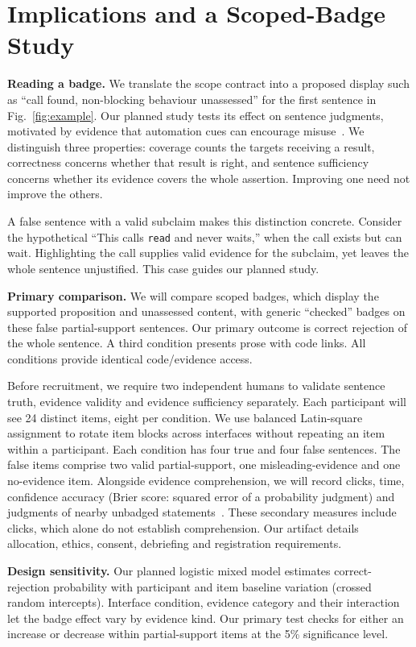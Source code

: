 \section{Implications and a Scoped-Badge Study}\label{sec:agenda}
\noindent\textbf{Reading a badge.} We translate the scope contract into a proposed display such as ``call found, non-blocking behaviour unassessed'' for the first sentence in Fig.~\ref{fig:example}. Our planned study tests its effect on sentence judgments, motivated by evidence that automation cues can encourage misuse~\cite{parasuraman1997automation,bucinca2021trust}. We distinguish three properties: coverage counts the targets receiving a result, correctness concerns whether that result is right, and sentence sufficiency concerns whether its evidence covers the whole assertion. Improving one need not improve the others.

A false sentence with a valid subclaim makes this distinction concrete. Consider the hypothetical ``This calls \texttt{read} and never waits,'' when the call exists but can wait. Highlighting the call supplies valid evidence for the subclaim, yet leaves the whole sentence unjustified. This case guides our planned study.

\noindent\textbf{Primary comparison.} We will compare scoped badges, which display the supported proposition and unassessed content, with generic ``checked'' badges on these false partial-support sentences. Our primary outcome is correct rejection of the whole sentence. A third condition presents prose with code links. All conditions provide identical code/evidence access.

Before recruitment, we require two independent humans to validate sentence truth, evidence validity and evidence sufficiency separately. Each participant will see 24 distinct items, eight per condition. We use balanced Latin-square assignment to rotate item blocks across interfaces without repeating an item within a participant. Each condition has four true and four false sentences. The false items comprise two valid partial-support, one misleading-evidence and one no-evidence item. Alongside evidence comprehension, we will record clicks, time, confidence accuracy (Brier score: squared error of a probability judgment) and judgments of nearby unbadged statements~\cite{pennycook2020impliedtruth}. These secondary measures include clicks, which alone do not establish comprehension. Our artifact details allocation, ethics, consent, debriefing and registration requirements.

\balance
\noindent\textbf{Design sensitivity.} Our planned logistic mixed model estimates correct-rejection probability with participant and item baseline variation (crossed random intercepts). Interface condition, evidence category and their interaction let the badge effect vary by evidence kind. Our primary test checks for either an increase or decrease within partial-support items at the 5\% significance level.

